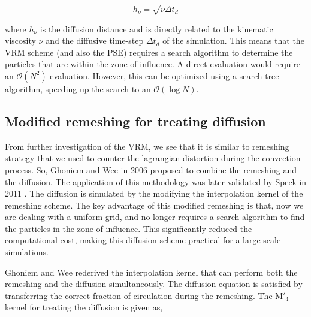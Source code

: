 	\begin{equation}
	h_{\nu} = \sqrt{\nu\Delta t_d}
	\end{equation}

where $h_{\nu}$ is the diffusion distance and is directly related to the kinematic viscosity $\nu$ and the diffusive time-step $\Delta t_d$ of the simulation. This means that the VRM scheme (and also the PSE) requires a search algorithm to determine the particles that are within the zone of influence. A direct evaluation would require an $\mathcal{O}\left(N^2\right)$ evaluation. However, this can be optimized using a search tree algorithm, speeding up the search to an $\mathcal{O}\left(\log N\right)$.



\subsection{Modified remeshing for treating diffusion}
From further investigation of the VRM, we see that it is similar to remeshing strategy that we used to counter the lagrangian distortion during the convection process. So, Ghoniem and Wee in 2006 \cite{Wee2006} proposed to combine the remeshing and the diffusion. The application of this methodology was later validated by Speck in 2011 \cite{Speck2011a}. The diffusion is simulated by the modifying the interpolation kernel of the remeshing scheme. The key advantage of this modified remeshing is that, now we are dealing with a uniform grid, and no longer requires a search algorithm to find the particles in the zone of influence. This significantly reduced the computational cost, making this diffusion scheme practical for a large scale simulations. 

Ghoniem and Wee rederived the interpolation kernel that can perform both the remeshing and the diffusion simultaneously. The diffusion equation is satisfied by transferring the correct fraction of circulation during the remeshing. The $\mathrm{M'}_4$ kernel for treating the diffusion is given as,

